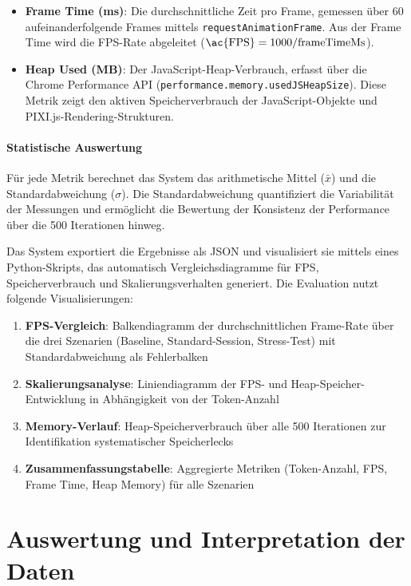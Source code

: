 \begin{itemize}
	\item \textbf{Frame Time (\ac{ms})}: Die durchschnittliche Zeit pro Frame, gemessen über 60 aufeinanderfolgende Frames mittels \texttt{requestAnimationFrame}. Aus der Frame Time wird die \ac{FPS}-Rate abgeleitet ($\text{\ac{FPS}} = 1000 / \text{frameTimeMs}$).

	\item \textbf{Heap Used (\ac{MB})}: Der JavaScript-Heap-Verbrauch, erfasst über die Chrome Performance \ac{API} (\texttt{performance.memory.usedJSHeapSize}). Diese Metrik zeigt den aktiven Speicherverbrauch der JavaScript-Objekte und PIXI.js-Rendering-Strukturen.
\end{itemize}

\paragraph{Statistische Auswertung}
Für jede Metrik berechnet das System das arithmetische Mittel ($\bar{x}$) und die Standardabweichung ($\sigma$). Die Standardabweichung quantifiziert die Variabilität der Messungen und ermöglicht die Bewertung der Konsistenz der Performance über die 500 Iterationen hinweg.

Das System exportiert die Ergebnisse als \ac{JSON} und visualisiert sie mittels eines Python-Skripts, das automatisch Vergleichsdiagramme für \ac{FPS}, Speicherverbrauch und Skalierungsverhalten generiert. Die Evaluation nutzt folgende Visualisierungen:

\begin{enumerate}
	\item \textbf{\ac{FPS}-Vergleich}: Balkendiagramm der durchschnittlichen Frame-Rate über die drei Szenarien (Baseline, Standard-Session, Stress-Test) mit Standardabweichung als Fehlerbalken
	\item \textbf{Skalierungsanalyse}: Liniendiagramm der \ac{FPS}- und Heap-Speicher-Entwicklung in Abhängigkeit von der Token-Anzahl
	\item \textbf{Memory-Verlauf}: Heap-Speicherverbrauch über alle 500 Iterationen zur Identifikation systematischer Speicherlecks
	\item \textbf{Zusammenfassungstabelle}: Aggregierte Metriken (Token-Anzahl, \ac{FPS}, Frame Time, Heap Memory) für alle Szenarien
\end{enumerate}

\section{Auswertung und Interpretation der Daten}
\label{sec:AuswertungInterpretation}

